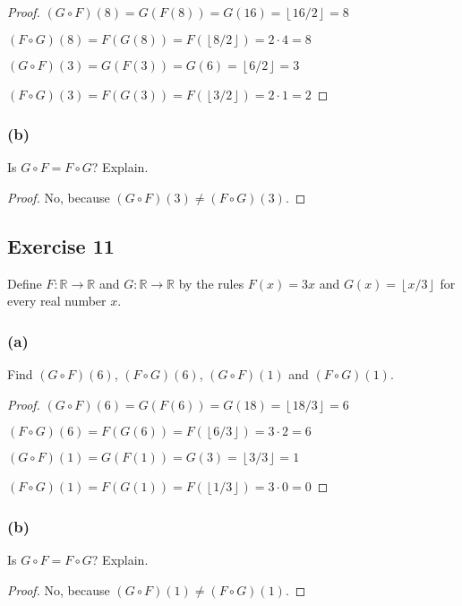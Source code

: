 \documentclass[14pt]{extarticle}
\newcommand{\R}{\mathbb{R}}
\newcommand{\floor}[1]{{\left\lfloor#1\right\rfloor}}
\begin{document}
\begin{proof}
    \((G \circ F)(8) = G(F(8)) = G(16) = \floor{16/2} = 8\)

    \((F \circ G)(8) = F(G(8)) = F(\floor{8/2}) = 2 \cdot 4 = 8\)

    \((G \circ F)(3) = G(F(3)) = G(6) = \floor{6/2} = 3\)

    \((F \circ G)(3) = F(G(3)) = F(\floor{3/2}) = 2 \cdot 1 = 2\)
\end{proof}

\subsubsection{(b)}
Is \(G \circ F = F \circ G\)? Explain.

\begin{proof}
    No, because \((G \circ F)(3) \neq (F \circ G)(3)\).
\end{proof}

\subsection{Exercise 11}
Define \(F: \R \to \R\) and \(G: \R \to \R\) by the rules
\(F(x) = 3x\) and \(G(x) = \floor{x/3}\) for every real number $x$.

\subsubsection{(a)}
Find \((G \circ F)(6)\), \((F \circ G)(6)\), \((G \circ F)(1)\) and \((F \circ G)(1)\).

\begin{proof}
    \((G \circ F)(6) = G(F(6)) = G(18) = \floor{18/3} = 6\)

    \((F \circ G)(6) = F(G(6)) = F(\floor{6/3}) = 3 \cdot 2 = 6\)

    \((G \circ F)(1) = G(F(1)) = G(3) = \floor{3/3} = 1\)

    \((F \circ G)(1) = F(G(1)) = F(\floor{1/3}) = 3 \cdot 0 = 0\)
\end{proof}

\subsubsection{(b)}
Is \(G \circ F = F \circ G\)? Explain.

\begin{proof}
    No, because \((G \circ F)(1) \neq (F \circ G)(1)\).
\end{proof}
\end{document}
